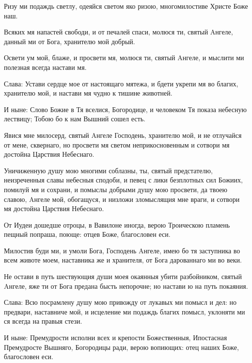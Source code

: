 
Ризу ми подаждь светлу, одеяйся светом яко ризою, многомилостиве Христе Боже наш.


  Всяких мя напастей свободи, и от печалей спаси, молюся ти, святый Aнгеле, данный ми от Бога, хранителю мой добрый.


  Освети ум мой, блаже, и просвети мя, молюся ти, святый Aнгеле, и мыслити ми полезная всегда настави мя.


  Слава: Устави сердце мое от настоящаго мятежа, и бдети укрепи мя во благих, хранителю мой, и настави мя чудно к тишине животней.


  И ныне: Слово Божие в Тя вселися, Богородице, и человеком Тя показа небесную лествицу; Тобою бо к нам Вышний сошел есть.



Явися мне милосерд, святый Aнгеле Господень, хранителю мой, и не отлучайся от мене, сквернаго, но просвети мя светом неприкосновенным и сотвори мя достойна Царствия Небеснаго.



Уничиженную душу мою многими соблазны, ты, святый предстателю, неизреченныя славы небесныя сподоби, и певец с лики безплотных сил Божиих, помилуй мя и сохрани, и помыслы добрыми душу мою просвети, да твоею славою, Aнгеле мой, обогащуся, и низложи зломыслящия мне враги, и сотвори мя достойна Царствия Небеснаго.



От Иудеи дошедше отроцы, в Вавилоне иногда, верою Троическою пламень пещный попраша, поюще: отцев Боже, благословен еси.


  Милостив буди ми, и умоли Бога, Господень Aнгеле, имею бо тя заступника во всем животе моем, наставника же и хранителя, от Бога дарованнаго ми во веки.


  Не остави в путь шествующия души моея окаянныя убити разбойником, святый Aнгеле, яже ти от Бога предана бысть непорочне; но настави ю на путь покаяния.


  Слава: Всю посрамлену душу мою привожду от лукавых ми помысл и дел: но предвари, наставниче мой, и исцеление ми подаждь благих помысл, уклоняти ми ся всегда на правыя стези.


  И ныне: Премудрости исполни всех и крепости Божественныя, Ипостасная Премудросте Вышняго, Богородицы ради, верою вопиющих: отец наших Боже, благословен еси.



